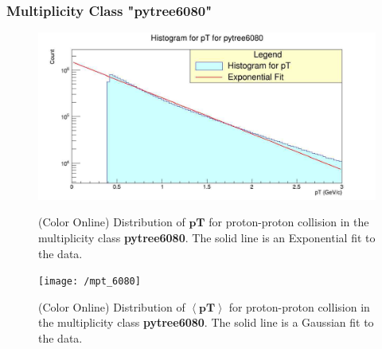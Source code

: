 \documentclass[letterpaper,aps,prc,superscriptaddress,nofootinbib,10pt,showpacs,floatfix]{revtex4-2}%
\begin{document}
\subsubsection{Multiplicity Class "pytree6080"}
\label{subsubsec:6080}
\vspace{-5mm}
\begin{figure}[!htb]
   \begin{minipage}{0.48\textwidth}
   \label{Fig:3a}
   \label{Fig:3b}
     \centering
     \renewcommand{\thefigure}{3a}
     \includegraphics[width=1.1\linewidth]{pt_6080}
     \caption{(Color Online) Distribution of $\mathbf{pT}$ for proton-proton collision in the multiplicity class \textbf{pytree6080}. The solid line is an Exponential fit to the data.}
   \end{minipage}\hfill
   \begin{minipage}{0.48\textwidth}
     \centering
     \renewcommand{\thefigure}{3b}
     \texttt{[image: /mpt\_6080]}
     \caption{(Color Online) Distribution of $\mathbf{\left<pT\right>}$ for proton-proton collision in the multiplicity class \textbf{pytree6080}. The solid line is a Gaussian fit to the data.}
   \end{minipage}
\end{figure}

\FloatBarrier
\vspace{-3mm}
\end{document}
